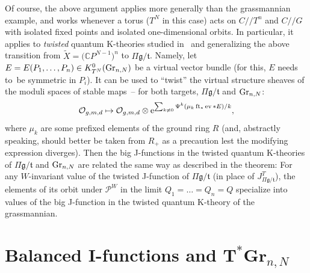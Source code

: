 \documentclass[10pt,a4paper]{amsart}
\numberwithin{equation}{section}
\def\O{\mathcal O}
\def\CC{\mathbb C}
\def\tilde{\widetilde}
\def\ev{\operatorname{ev}}
\def\ft{\operatorname{ft}}
\theoremstyle{definition}
\theoremstyle{plain}
\begin{document}
\begin{Remark}\label{rmk4}
Of course, the above argument applies more generally than the grassmannian example, and works whenever a torus ($T^N$ in this case) acts on $C//T^n$ and $C//G$ with isolated fixed points and isolated one-dimensional orbits. In particular, it applies to {\em twisted} quantum K-theories studied in~\cite{Givental:perm11} and generalizing the above transition from $\tilde{X}=\big(\CC P^{N-1}\big)^n$ to $\Pi \mathfrak{g}/\mathfrak{t}$. Namely, let $E=E(P_1,\dots,P_n) \in K^0_{T^N}({\rm Gr}_{n,N})$ be a virtual vector bundle (for this, $E$ needs to~be symmetric in $P_i$). It can be used to ``twist'' the virtual structure sheaves of the moduli spaces of stable maps~-- for both targets, $\Pi \mathfrak{g}/\mathfrak{t}$ and ${\rm Gr}_{n,N}$:
\[
\O_{g,m,d} \mapsto \O_{g,m,d}\otimes {\rm e}^{ \sum_{k\neq 0} \Psi^k(\mu_k \ft_*\ev*E)/k},
\]
where $\mu_k$ are some prefixed elements of the ground ring $R$ (and, abstractly speaking, should better be taken from $R_{+}$ as a precaution lest the modifying expression diverges). Then the big J-functions in the twisted quantum K-theories of $\Pi \mathfrak{g}/\mathfrak{t}$ and ${\rm Gr}_{n,N}$ are related the same way as described in the theorem: For any $W$-invariant value of the twisted J-function of $\Pi \mathfrak{g}/\mathfrak{t}$ (in place of $J^T_{\Pi \mathfrak{g}/\mathfrak{t}}$), the elements of its orbit under ${\mathcal P}^W$ in the limit $Q_1=\dots=Q_n=Q$ specialize into values of the big J-function in the twisted quantum K-theory of the grassmannian.
\end{Remark}


\section[Balanced I-functions and T* Gr {n,N}]{Balanced I-functions and ${\boldsymbol T^*{\mathbf{Gr}}_{n,N}}$}\label{Sec5}
\end{document}
